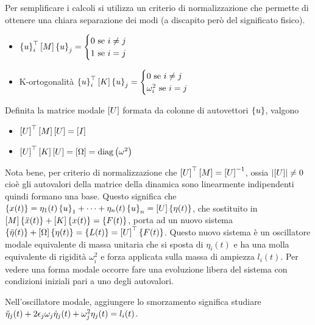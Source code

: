 Per semplificare i calcoli si utilizza un criterio di normalizzazione che permette di ottenere una chiara separazione dei modi (a discapito però del significato fisico).
\begin{itemize}
    \item \(\left\{ u \right\}_i^\top \left[M\right] \left\{ u \right\}_j = \begin{cases} 0 \text{  se } i\neq j \\ 1 \text{  se } i=j \end{cases} \) 
    \item K-ortogonalità \(\left\{ u \right\}_i^\top \left[ K \right] \left\{ u \right\}_j = \begin{cases} 0 \text{  se } i\neq j \\ \omega_i^2 \text{  se } i=j \end{cases} \) 
\end{itemize}

Definita la matrice modale \(\left[ U \right]\) formata da colonne di  autovettori \(\left\{ u \right\}\), valgono
\begin{itemize}
    \item \(\left[ U \right]^\top \left[M\right] \left[ U \right] = \left[ I \right] \)
    \item \(\left[ U \right]^\top \left[ K \right] \left[ U \right] = \left[ \Omega \right] =  \operatorname{diag}\left(\omega^2\right) \)
\end{itemize}

Nota bene, per criterio di normalizzazione che \(\left[ U \right]^\top \left[M\right] = \left[ U \right]^{-1}\), ossia \(\left|\left[ U \right]\right| \neq 0\) cioè gli autovalori della matrice della dinamica sono linearmente indipendenti quindi formano una base.
Questo significa che \(\left\{ x(t) \right\} = \eta_1(t) \left\{ u \right\}_1 + \dots + \eta_n(t) \left\{ u \right\}_n = \left[ U \right] \left\{ \eta(t) \right\}\), che sostituito in \(\left[M\right] \left\{ \Ddot{x}(t) \right\} + \left[ K \right] \left\{ x(t) \right\} = \left\{ F(t) \right\}\), porta ad un nuovo sistema \(\left\{ \Ddot{\eta}(t) \right\} + \left[ \Omega \right] \left\{ \eta(t) \right\} = \left\{ L(t) \right\} = \left[ U \right]^\top \left\{ F(t) \right\} \).
Questo nuovo sistema è un oscillatore modale equivalente di massa unitaria che si sposta di \(\eta_i(t)\) e ha una molla equivalente di rigidità \(\omega_i^2\) e forza applicata sulla massa di ampiezza \(l_i(t)\).
Per vedere una forma modale occorre fare una evoluzione libera del sistema con condizioni iniziali pari a uno degli autovalori.

Nell'oscillatore modale, aggiungere lo smorzamento significa studiare \( \Ddot{\eta}_j(t) + 2\epsilon_j\omega_j \dot{\eta}_j(t) + \omega^2_j \eta_j(t) = l_i(t) \).

